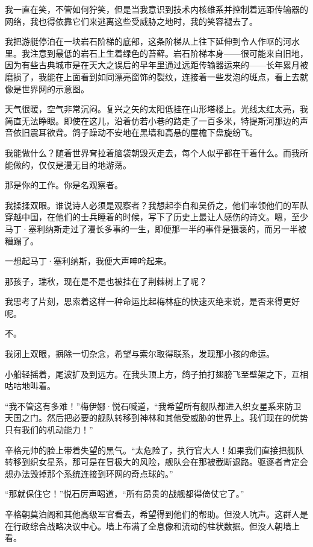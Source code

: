\documentclass[AutoFakeBold=true]{book}
\begin{document}
我一直在笑，不管如何狞笑，但是当我意识到技术内核维系并控制着远距传输器的网络，我也得依靠它们来逃离这些受威胁之地时，我的笑容褪去了。

我把游艇停泊在一块岩石阶梯的底部，这条阶梯从上往下延伸到令人作呕的河水里。我注意到最低的岩石上生着绿色的苔藓。岩石阶梯本身——很可能来自旧地，因为有些古典城市是在天大之误后的早年里通过远距传输器运来的——长年累月被磨损了，我能在上面看到如同漂亮窗饰的裂纹，连接着一些发泡的斑点，看上去就像是世界网的示意图。

天气很暖，空气非常沉闷。复兴之矢的太阳低挂在山形塔楼上。光线太红太亮，我简直无法睁眼。即使在这儿，沿着仿若小巷的路走了一百多米，特提斯河那边的声音依旧震耳欲聋。鸽子躁动不安地在黑墙和高悬的屋檐下盘旋纷飞。

{\kaishu 我能做什么？}随着世界耷拉着脑袋朝毁灭走去，每个人似乎都在干着什么。而我所能做的，仅仅是漫无目的地游荡。

{\kaishu 那是你的工作。你是名观察者。}

我揉揉双眼。谁说诗人必须是观察者？我想起李白和吴侨之，他们率领他们的军队穿越中国，在他们的士兵睡着的时候，写下了历史上最让人感伤的诗文。嗯，至少马丁·塞利纳斯走过了漫长多事的一生，即便那一半的事件是猥亵的，而另一半被糟蹋了。

一想起马丁·塞利纳斯，我便大声呻吟起来。

{\kaishu 那孩子，瑞秋，现在是不是也被挂在了荆棘树上了呢？}

我思考了片刻，思索着这样一种命运比起梅林症的快速灭绝来说，是否来得更好呢。

{\kaishu 不。}

我闭上双眼，摒除一切杂念，希望与索尔取得联系，发现那小孩的命运。

小船轻摇着，尾波扩及到远方。在我头顶上方，鸽子拍打翅膀飞至壁架之下，互相咕咕地叫着。

\vspace*{1em}

``我不管这有多难！''梅伊娜·悦石喊道，``我希望所有舰队都进入织女星系来防卫天国之门。然后把必要的舰队转移到神林和其他受威胁的世界上。我们现在的优势只有我们的机动能力！''

辛格元帅的脸上带着失望的黑气。``太危险了，执行官大人！如果我们直接把舰队转移到织女星系，那可是在冒极大的风险，舰队会在那被截断退路。驱逐者肯定会想办法毁掉那个系统连接到环网的奇点球的。''

``那就保住它！''悦石厉声喝道，``所有昂贵的战舰都得倚仗它了。''

辛格朝莫泊阁和其他高级军官看去，希望得到他们的帮助。但没人吭声。这群人是在行政综合战略决议中心。墙上布满了全息像和流动的柱状数据。但没人朝墙上看。
\end{document}
